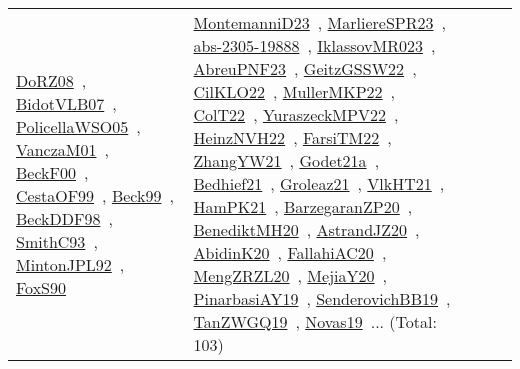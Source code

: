 {\begin{longtable}{lp{3cm}>{\raggedright\arraybackslash}p{6cm}>{\raggedright\arraybackslash}p{6cm}>{\raggedright\arraybackslash}p{8cm}}
\href{../works/DoRZ08.pdf}{DoRZ08}~\cite{DoRZ08}, \href{../works/BidotVLB07.pdf}{BidotVLB07}~\cite{BidotVLB07}, \href{../works/PolicellaWSO05.pdf}{PolicellaWSO05}~\cite{PolicellaWSO05}, \href{../works/VanczaM01.pdf}{VanczaM01}~\cite{VanczaM01}, \href{../works/BeckF00.pdf}{BeckF00}~\cite{BeckF00}, \href{../works/CestaOF99.pdf}{CestaOF99}~\cite{CestaOF99}, \href{../works/Beck99.pdf}{Beck99}~\cite{Beck99}, \href{../works/BeckDDF98.pdf}{BeckDDF98}~\cite{BeckDDF98}, \href{../works/SmithC93.pdf}{SmithC93}~\cite{SmithC93}, \href{../works/MintonJPL92.pdf}{MintonJPL92}~\cite{MintonJPL92}, \href{../works/FoxS90.pdf}{FoxS90}~\cite{FoxS90} & \href{../works/MontemanniD23.pdf}{MontemanniD23}~\cite{MontemanniD23}, \href{../works/MarliereSPR23.pdf}{MarliereSPR23}~\cite{MarliereSPR23}, \href{../works/abs-2305-19888.pdf}{abs-2305-19888}~\cite{abs-2305-19888}, \href{../works/IklassovMR023.pdf}{IklassovMR023}~\cite{IklassovMR023}, \href{../works/AbreuPNF23.pdf}{AbreuPNF23}~\cite{AbreuPNF23}, \href{../works/GeitzGSSW22.pdf}{GeitzGSSW22}~\cite{GeitzGSSW22}, \href{../works/CilKLO22.pdf}{CilKLO22}~\cite{CilKLO22}, \href{../works/MullerMKP22.pdf}{MullerMKP22}~\cite{MullerMKP22}, \href{../works/ColT22.pdf}{ColT22}~\cite{ColT22}, \href{../works/YuraszeckMPV22.pdf}{YuraszeckMPV22}~\cite{YuraszeckMPV22}, \href{../works/HeinzNVH22.pdf}{HeinzNVH22}~\cite{HeinzNVH22}, \href{../works/FarsiTM22.pdf}{FarsiTM22}~\cite{FarsiTM22}, \href{../works/ZhangYW21.pdf}{ZhangYW21}~\cite{ZhangYW21}, \href{../works/Godet21a.pdf}{Godet21a}~\cite{Godet21a}, \href{../works/Bedhief21.pdf}{Bedhief21}~\cite{Bedhief21}, \href{../works/Groleaz21.pdf}{Groleaz21}~\cite{Groleaz21}, \href{../works/VlkHT21.pdf}{VlkHT21}~\cite{VlkHT21}, \href{../works/HamPK21.pdf}{HamPK21}~\cite{HamPK21}, \href{../works/BarzegaranZP20.pdf}{BarzegaranZP20}~\cite{BarzegaranZP20}, \href{../works/BenediktMH20.pdf}{BenediktMH20}~\cite{BenediktMH20}, \href{../works/AstrandJZ20.pdf}{AstrandJZ20}~\cite{AstrandJZ20}, \href{../works/AbidinK20.pdf}{AbidinK20}~\cite{AbidinK20}, \href{../works/FallahiAC20.pdf}{FallahiAC20}~\cite{FallahiAC20}, \href{../works/MengZRZL20.pdf}{MengZRZL20}~\cite{MengZRZL20}, \href{../works/MejiaY20.pdf}{MejiaY20}~\cite{MejiaY20}, \href{../works/PinarbasiAY19.pdf}{PinarbasiAY19}~\cite{PinarbasiAY19}, \href{../works/SenderovichBB19.pdf}{SenderovichBB19}~\cite{SenderovichBB19}, \href{../works/TanZWGQ19.pdf}{TanZWGQ19}~\cite{TanZWGQ19}, \href{../works/Novas19.pdf}{Novas19}~\cite{Novas19}... (Total: 103)\\

\end{longtable}}
